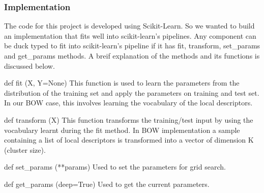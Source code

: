 \documentclass[final,leqno,onefignum,onetabnum]{siamltexmm}
\begin{document}
\subsubsection{Implementation}
The code for this project is developed using Scikit-Learn\cite{website:sklearn}.  So we wanted to build an implementation that fits well into scikit-learn's pipelines.
Any component can be duck typed to fit into scikit-learn's pipeline if it has fit, transform, set\_params and get\_params methods.  A breif explanation of the methods and its functions is discussed below.
\begin{description}
  \item{def fit (X, Y=None)}  This function is used to learn the parameters from the distribution of the training set and apply the parameters on training and test set.  In our BOW case, this involves learning the vocabulary of the local descriptors.
  \item{def transform (X)}  This function transforms the training/test input by using the vocabulary learnt during the fit method.  In BOW implementation a sample containing a list of local descriptors is transformed into a vector of dimension K (cluster size).
  \item{def set\_params (**params)} Used to set the parameters for grid search.
  \item{def get\_params (deep=True)} Used to get the current parameters.
\end{description}
\end{document}
